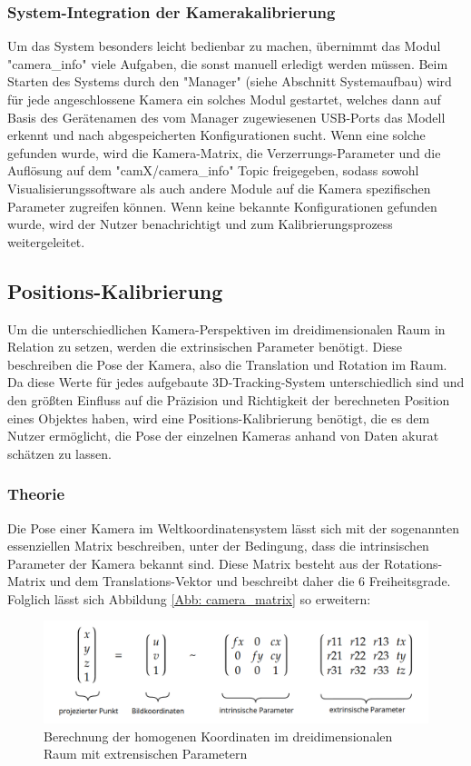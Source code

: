 \documentclass[12pt, ngerman]{article}
\begin{document}
\subsubsection{System-Integration der Kamerakalibrierung}
Um das System besonders leicht bedienbar zu machen, übernimmt das Modul "camera\_info" viele Aufgaben, die sonst manuell erledigt werden müssen. Beim Starten des Systems durch den "Manager" (siehe Abschnitt Systemaufbau) wird für jede angeschlossene Kamera ein solches Modul gestartet, welches dann auf Basis des Gerätenamen des vom Manager zugewiesenen USB-Ports das Modell erkennt und nach abgespeicherten Konfigurationen sucht. Wenn eine solche gefunden wurde, wird die Kamera-Matrix, die Verzerrungs-Parameter und die Auflösung auf dem "camX/camera\_info" Topic freigegeben, sodass sowohl Visualisierungssoftware als auch andere Module auf die Kamera spezifischen Parameter zugreifen können. Wenn keine bekannte Konfigurationen gefunden wurde, wird der Nutzer benachrichtigt und zum Kalibrierungsprozess weitergeleitet.

\subsection{Positions-Kalibrierung}
Um die unterschiedlichen Kamera-Perspektiven im dreidimensionalen Raum in Relation zu setzen, werden die extrinsischen Parameter benötigt. Diese beschreiben die Pose der Kamera, also die Translation und Rotation im Raum. Da diese Werte für jedes aufgebaute 3D-Tracking-System unterschiedlich sind und den größten Einfluss auf die Präzision und Richtigkeit der berechneten Position eines Objektes haben, wird eine Positions-Kalibrierung benötigt, die es dem Nutzer ermöglicht, die Pose der einzelnen Kameras anhand von Daten akurat schätzen zu lassen. 

\subsubsection{Theorie}
Die Pose einer Kamera im Weltkoordinatensystem lässt sich mit der sogenannten essenziellen Matrix beschreiben, unter der Bedingung, dass die intrinsischen Parameter der Kamera bekannt sind. Diese Matrix besteht aus der Rotations-Matrix und dem Translations-Vektor und beschreibt daher die 6 Freiheitsgrade. Folglich lässt sich Abbildung \ref{Abb: camera_matrix} so erweitern:

\begin{figure}[hbtp!]
    \includegraphics[width=\textwidth]{matrix_shit.png}
    \caption{Berechnung der homogenen Koordinaten im dreidimensionalen Raum mit extrensischen Parametern}
    \label{Abb: essential_matrix}
\end{figure}
\end{document}
